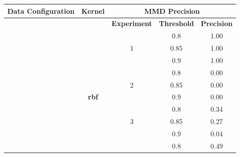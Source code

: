 \documentclass{mpaper}
\begin{document}
\begin{table}[]
\centering
\begin{tabular}{|l|c|ccc|}
\hline
\textbf{Data   Configuration}               & \textbf{Kernel} & \multicolumn{3}{c|}{\textbf{MMD Precision}}                                                                   \\ \hline
                                            &                 & \multicolumn{1}{c|}{\textbf{Experiment}}       & \multicolumn{1}{c|}{\textbf{Threshold}} & \textbf{Precision} \\ \cline{3-5} 
                                            &                 & \multicolumn{1}{c|}{}                          & \multicolumn{1}{c|}{0.8}                & 1.00               \\
                                            &                 & \multicolumn{1}{c|}{1}                         & \multicolumn{1}{c|}{0.85}               & 1.00               \\
                                            &                 & \multicolumn{1}{c|}{}                          & \multicolumn{1}{c|}{0.9}                & 1.00               \\ \cline{3-5} 
                                            &                 & \multicolumn{1}{c|}{}                          & \multicolumn{1}{c|}{0.8}                & 0.00               \\
                                            & \textbf{}       & \multicolumn{1}{c|}{2}                         & \multicolumn{1}{c|}{0.85}               & 0.00               \\
                                            & \textbf{rbf}    & \multicolumn{1}{c|}{}                          & \multicolumn{1}{c|}{0.9}                & 0.00               \\ \cline{3-5} 
                                            &                 & \multicolumn{1}{c|}{}                          & \multicolumn{1}{c|}{0.8}                & 0.34               \\
                                            &                 & \multicolumn{1}{c|}{3}                         & \multicolumn{1}{c|}{0.85}               & 0.27               \\
                                            &                 & \multicolumn{1}{c|}{}                          & \multicolumn{1}{c|}{0.9}                & 0.04               \\ \cline{3-5} 
                                            &                 & \multicolumn{1}{l|}{}                          & \multicolumn{1}{c|}{0.8}                & 0.49               \\

\end{tabular}
\end{table}
\end{document}
